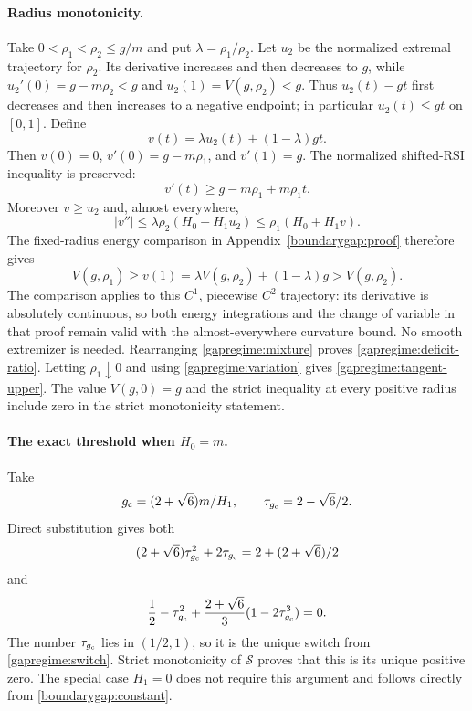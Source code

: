 \paragraph{Radius monotonicity.}
Take $0<\rho_1<\rho_2\le g/m$ and put $\lambda=\rho_1/\rho_2$.
Let $u_2$ be the normalized extremal trajectory for $\rho_2$.
Its derivative increases and then decreases to $g$, while
$u_2'(0)=g-m\rho_2<g$ and $u_2(1)=V(g,\rho_2)<g$.
Thus $u_2(t)-gt$ first decreases and then increases to a negative
endpoint; in particular $u_2(t)\le gt$ on $[0,1]$.
Define
\[
 v(t)=\lambda u_2(t)+(1-\lambda)gt.
\]
Then $v(0)=0$, $v'(0)=g-m\rho_1$, and $v'(1)=g$.
The normalized shifted-RSI inequality is preserved:
\[
 v'(t)\ge g-m\rho_1+m\rho_1t.
\]
Moreover $v\ge u_2$ and, almost everywhere,
\[
 |v''|\le\lambda\rho_2(H_0+H_1u_2)
          \le\rho_1(H_0+H_1v).
\]
The fixed-radius energy comparison in Appendix~\ref{boundarygap:proof}
therefore gives
\begin{equation}\label{gapregime:mixture}
 V(g,\rho_1)\ge v(1)
       =\lambda V(g,\rho_2)+(1-\lambda)g>V(g,\rho_2).
\end{equation}
The comparison applies to this $C^1$, piecewise $C^2$ trajectory:
its derivative is absolutely continuous, so both energy integrations
and the change of variable in that proof remain valid with the
almost-everywhere curvature bound.  No smooth extremizer is needed.
Rearranging \eqref{gapregime:mixture} proves
\eqref{gapregime:deficit-ratio}.  Letting $\rho_1\downarrow0$
and using \eqref{gapregime:variation} gives
\eqref{gapregime:tangent-upper}.  The value $V(g,0)=g$ and the
strict inequality at every positive radius include zero in the
strict monotonicity statement.

\paragraph{The exact threshold when $H_0=m$.}
Take
\[
 g_{\rm c}=(2+\sqrt6)m/H_1,
 \qquad \tau_{g_{\rm c}}=2-\sqrt6/2.
\]
Direct substitution gives both
\[
 (2+\sqrt6)\tau_{g_{\rm c}}^2+2\tau_{g_{\rm c}}
      =2+(2+\sqrt6)/2
\]
and
\[
 \frac12-\tau_{g_{\rm c}}^2
   +\frac{2+\sqrt6}{3}(1-2\tau_{g_{\rm c}}^3)=0.
\]
The number $\tau_{g_{\rm c}}$ lies in $(1/2,1)$, so it is the
unique switch from \eqref{gapregime:switch}.  Strict monotonicity of
$\mathcal S$ proves that this is its unique positive zero.
The special case $H_1=0$ does not require this argument and follows
directly from \eqref{boundarygap:constant}.
